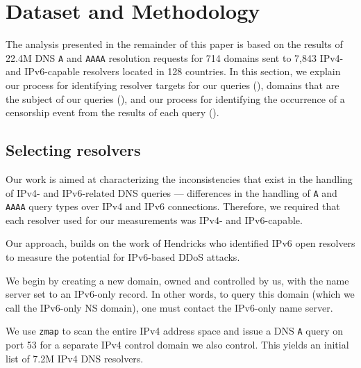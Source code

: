 \section{Dataset and Methodology}\label{sec:v4vsv6-methodology}

The analysis presented in the remainder of this paper is based on the results of
22.4M DNS {\tt A} and {\tt AAAA} resolution requests for 714 domains sent to
7,843 IPv4- and IPv6-capable resolvers located in 128 countries.
%
In this section, we explain our process for identifying resolver targets for
our queries (), domains that are the subject of
our queries (), and our process for identifying
the occurrence of a censorship event from the results of each query
().

\subsection{Selecting resolvers} \label{sec:v4vsv6-methodology:resolvers}
%
Our work is aimed at characterizing the inconsistencies that exist in the
handling of IPv4- and IPv6-related DNS queries --- \ie differences in the
handling of {\tt A} and {\tt AAAA} query types over IPv4 and IPv6
connections. Therefore, we required that each resolver used for our
measurements was IPv4- and IPv6-capable.
%

Our approach, builds on the work of Hendricks \etal
\cite{hendriks2017potential} who identified IPv6 open resolvers to measure the
potential for IPv6-based DDoS attacks.

We begin by creating a new domain, owned and controlled by us, with the name server
set to an IPv6-only record. In other words, to query this domain (which we call
the IPv6-only NS domain), one must contact the IPv6-only name server.
%

We use {\tt zmap} \cite{Durumeric13zmap} to scan the entire IPv4 address
space and issue a DNS {\tt A} query on port 53 for a separate IPv4 control
domain we also control. This yields an initial list of 7.2M IPv4 DNS resolvers.
%

